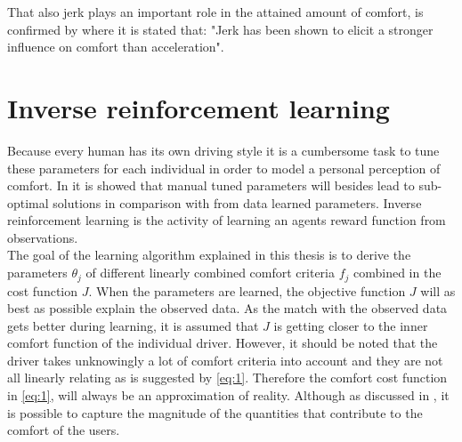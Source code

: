 That also jerk plays an important role in the attained amount of comfort, is confirmed by \cite{Gianna1996} where it is stated that: "Jerk has been shown to elicit a stronger influence on comfort than acceleration".




\section{Inverse reinforcement learning}
Because every human has its own driving style it is a cumbersome task to tune these parameters for each individual in order to model a personal perception of comfort. In \cite{Powers} it is showed that manual tuned parameters will besides lead  to sub-optimal solutions in comparison with from data learned parameters. Inverse reinforcement learning is the activity of learning an agents reward function from observations. \\

The goal of the learning algorithm explained in this thesis is to derive the parameters $\theta_j$ of different linearly combined comfort criteria $f_j$ combined in the cost function $J$. When the parameters are learned, the objective function $J$ will as best as possible explain the observed data. As the match with the observed data gets better during learning, it is assumed that $J$ is getting closer to the inner comfort function of the individual driver. However, it should be noted that the driver takes unknowingly a lot of comfort criteria into account and they are not all linearly relating as is suggested by \ref{eq:1}. Therefore the comfort cost function in \ref{eq:1}, will always be an approximation of reality. Although as discussed in \cite{Kuderer2015a}, it is possible to capture the magnitude of the quantities that contribute to the comfort of the users.\\

